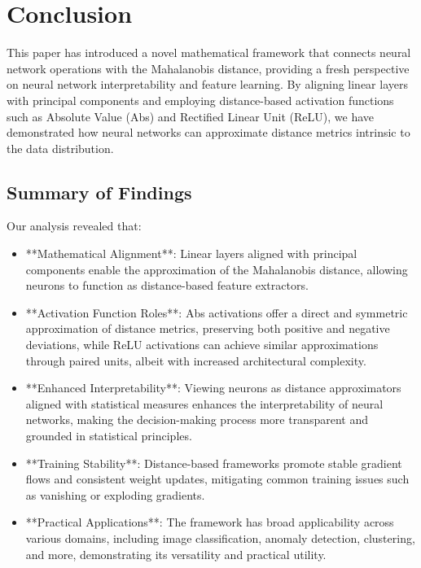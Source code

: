 
\section{Conclusion}
\label{sec:conclusion}

This paper has introduced a novel mathematical framework that connects neural network operations with the Mahalanobis distance, providing a fresh perspective on neural network interpretability and feature learning. By aligning linear layers with principal components and employing distance-based activation functions such as Absolute Value (Abs) and Rectified Linear Unit (ReLU), we have demonstrated how neural networks can approximate distance metrics intrinsic to the data distribution.

\subsection{Summary of Findings}

Our analysis revealed that:
\begin{itemize}
    \item **Mathematical Alignment**: Linear layers aligned with principal components enable the approximation of the Mahalanobis distance, allowing neurons to function as distance-based feature extractors.
    \item **Activation Function Roles**: Abs activations offer a direct and symmetric approximation of distance metrics, preserving both positive and negative deviations, while ReLU activations can achieve similar approximations through paired units, albeit with increased architectural complexity.
    \item **Enhanced Interpretability**: Viewing neurons as distance approximators aligned with statistical measures enhances the interpretability of neural networks, making the decision-making process more transparent and grounded in statistical principles.
    \item **Training Stability**: Distance-based frameworks promote stable gradient flows and consistent weight updates, mitigating common training issues such as vanishing or exploding gradients.
    \item **Practical Applications**: The framework has broad applicability across various domains, including image classification, anomaly detection, clustering, and more, demonstrating its versatility and practical utility.
\end{itemize}

